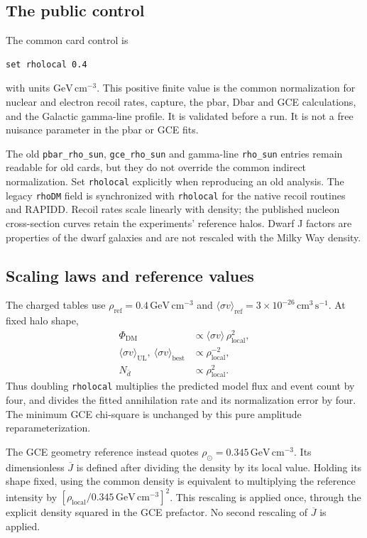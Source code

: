 \documentclass[11pt,a4paper]{article}
\newcommand{\sv}{\langle\sigma v\rangle}
\newcommand{\GeV}{\mathrm{GeV}}
\newcommand{\dbar}{\bar d}
\begin{document}
\subsection{The public control}
The common card control is
\begin{lstlisting}
set rholocal 0.4
\end{lstlisting}
with units $\GeV\,\mathrm{cm}^{-3}$. This positive finite value is the common normalization for nuclear and electron recoil rates, capture, the pbar, Dbar and GCE calculations, and the Galactic gamma-line profile. It is validated before a run. It is not a free nuisance parameter in the pbar or GCE fits.

The old \texttt{pbar\_rho\_sun}, \texttt{gce\_rho\_sun} and gamma-line \texttt{rho\_sun} entries remain readable for old cards, but they do not override the common indirect normalization. Set \texttt{rholocal} explicitly when reproducing an old analysis. The legacy \texttt{rhoDM} field is synchronized with \texttt{rholocal} for the native recoil routines and RAPIDD. Recoil rates scale linearly with density; the published nucleon cross-section curves retain the experiments' reference halos. Dwarf J factors are properties of the dwarf galaxies and are not rescaled with the Milky Way density.

\subsection{Scaling laws and reference values}
The charged tables use $\rho_{\mathrm{ref}}=0.4\,\GeV\,\mathrm{cm}^{-3}$ and $\sv_{\mathrm{ref}}=3\times10^{-26}\,\mathrm{cm}^3\,\mathrm{s}^{-1}$. At fixed halo shape,
\begin{align}
\Phi_{\mathrm{DM}} &\propto \sv\,\rho_{\mathrm{local}}^2,\\
\sv_{\mathrm{UL}},\ \sv_{\mathrm{best}} &\propto \rho_{\mathrm{local}}^{-2},\\
N_{\dbar} &\propto \rho_{\mathrm{local}}^2.
\end{align}
Thus doubling \texttt{rholocal} multiplies the predicted model flux and event count by four, and divides the fitted annihilation rate and its normalization error by four. The minimum GCE chi-square is unchanged by this pure amplitude reparameterization.

The GCE geometry reference instead quotes $\rho_\odot=0.345\,\GeV\,\mathrm{cm}^{-3}$. Its dimensionless $\overline J$ is defined after dividing the density by its local value. Holding its shape fixed, using the common density is equivalent to multiplying the reference intensity by $[\rho_{\mathrm{local}}/0.345\,\GeV\,\mathrm{cm}^{-3}]^2$. This rescaling is applied once, through the explicit density squared in the GCE prefactor. No second rescaling of $\overline J$ is applied.
\end{document}
